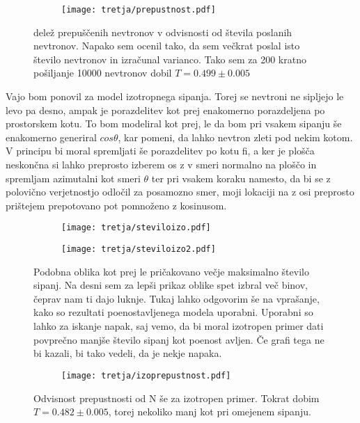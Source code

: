 \documentclass{article}
\begin{document}
\begin{figure}[H]
\centering
\begin{subfigure}{.7\textwidth}
\texttt{[image: tretja/prepustnost.pdf]}
\end{subfigure}
\caption*{delež prepuščenih nevtronov v odvisnosti od števila poslanih nevtronov. Napako sem ocenil tako, da sem večkrat poslal isto število nevtronov in izračunal varianco. Tako sem za 200 kratno pošiljanje 10000 nevtronov dobil $T=0.499 \pm 0.005$}
\end{figure}

Vajo bom ponovil za model izotropnega sipanja. Torej se nevtroni ne sipljejo le levo pa desno, ampak je porazdelitev kot prej enakomerno porazdeljena po prostorskem kotu. To bom modeliral kot prej, le da bom pri vsakem sipanju še enakomerno generiral $cos\theta$, kar pomeni, da lahko nevtron zleti pod nekim kotom. V principu bi moral spremljati še porazdelitev po kotu fi, a ker je plošča neskončna si lahko preprosto izberem os z v smeri normalno na ploščo in spremljam azimutalni kot smeri $\theta$ ter pri vsakem koraku namesto, da bi se z polovično verjetnostjo odločil za posamozno smer, moji lokaciji na z osi preprosto prištejem prepotovano pot pomnoženo z kosinusom.

\begin{figure}[H]
\centering
\begin{subfigure}{.49\textwidth}
\texttt{[image: tretja/steviloizo.pdf]}
\end{subfigure}
\begin{subfigure}{.49\textwidth}
\texttt{[image: tretja/steviloizo2.pdf]}
\end{subfigure}
\caption*{Podobna oblika kot prej le pričakovano večje maksimalno število sipanj. Na desni sem za lepši prikaz oblike spet izbral več binov, čeprav nam ti dajo luknje. Tukaj lahko odgovorim še na vprašanje, kako so rezultati poenostavljenega modela uporabni. Uporabni so lahko za iskanje napak, saj vemo, da bi moral izotropen primer dati povprečno manjše število sipanj kot poenost
avljen. Če grafi tega ne bi kazali, bi tako vedeli, da je nekje napaka.}
\end{figure}

\begin{figure}[H]
\centering
\begin{subfigure}{.7\textwidth}
\texttt{[image: tretja/izoprepustnost.pdf]}
\end{subfigure}
\caption*{Odvisnost prepustnosti od N še za izotropen primer. Tokrat dobim $T=0.482 \pm 0.005$, torej nekoliko manj kot pri omejenem sipanju.}
\end{figure}
\end{document}
